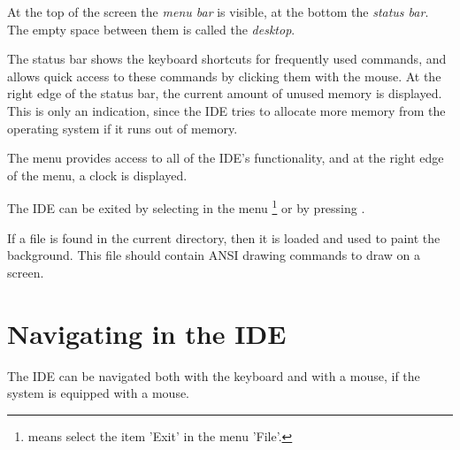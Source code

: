 
At the top of the screen the \emph{menu bar} is visible, at the bottom
the \emph{status bar}. The empty space between them is called the
\emph{desktop}.

The status bar shows the keyboard shortcuts for frequently used
commands, and allows quick access to these commands by clicking
them with the mouse.
At the right edge of the status bar, the current amount of unused
memory is displayed. This is only an indication, since the IDE
tries to allocate more memory from the operating system if it
runs out of memory.

The menu provides access to all of the IDE's functionality, and
at the right edge of the menu, a clock is displayed.

The IDE can be exited by selecting  in the menu
\footnote{ means select the item 'Exit' in the menu 'File'.}
or by pressing .

\begin{remark}
If a file  is found in the current directory,
then it is loaded and used to paint the background.
This file should contain ANSI drawing commands to draw on a screen.
\end{remark}

\section{Navigating in the IDE}
The IDE can be navigated both with the keyboard and with a mouse, if the
system is equipped with a mouse.
%
%
